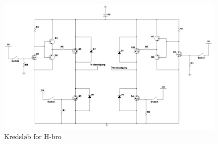 \begin{figure}[H]
	\centering
	\includegraphics[width=\textwidth]{DesignOgImplementering/images/H-bro}
	\caption{Kredsløb for H-bro}
	\label{fig:hbro}
	\end{figure}

